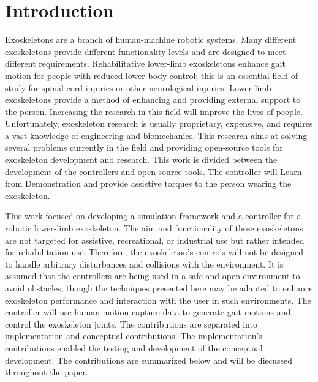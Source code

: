 \chapter{Introduction}

Exoskeletons are a branch of human-machine robotic systems. Many different exoskeletons provide different functionality levels and are designed to meet different requirements. Rehabilitative lower-limb exoskeletons enhance gait motion for people with reduced lower body control; this is an essential field of study for spinal cord injuries or other neurological injuries. Lower limb exoskeletons provide a method of enhancing and providing external support to the person. Increasing the research in this field will improve the lives of people. Unfortunately, exoskeleton research is usually proprietary, expensive, and requires a vast knowledge of engineering and biomechanics. This research aims at solving several problems currently in the field and providing open-source tools for exoskeleton development and research. This work is divided between the development of the controllers and open-source tools. The controller will Learn from Demonstration and provide assistive torques to the person wearing the exoskeleton.


This work focused on developing a simulation framework and a controller for a robotic lower-limb exoskeleton. The aim and functionality of these exoskeletons are not targeted for assistive, recreational, or industrial use but rather intended for rehabilitation use. Therefore, the exoskeleton's controls will not be designed to handle arbitrary disturbances and collisions with the environment. It is assumed that the controllers are being used in a safe and open environment to avoid obstacles, though the techniques presented here may be adapted to enhance exoskeleton performance and interaction with the user in such environments. The controller will use human motion capture data to generate gait motions and control the exoskeleton joints. The contributions are separated into implementation and conceptual contributions. The implementation's contributions enabled the testing and development of the conceptual development. The contributions are summarized below and will be discussed throughout the paper. 

